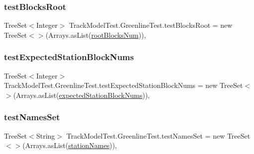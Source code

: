 \subsubsection{\texorpdfstring{test\+Blocks\+Root}{testBlocksRoot}}
{\footnotesize\ttfamily Tree\+Set$<$Integer$>$ Track\+Model\+Test.\+Greenline\+Test.\+test\+Blocks\+Root = new Tree\+Set$<$$>$(Arrays.\+as\+List(\hyperlink{classTrackModelTest_1_1GreenlineTest_a86d7af0d8ab2f0c855bdca4a06220e1d}{root\+Blocks\+Num}))\hspace{0.3cm}{\ttfamily [static]}, {\ttfamily [private]}}

\mbox{\label{classTrackModelTest_1_1GreenlineTest_a96de7e923c81cdf0dd85ece9d95104cc}} 
\subsubsection{\texorpdfstring{test\+Expected\+Station\+Block\+Nums}{testExpectedStationBlockNums}}
{\footnotesize\ttfamily Tree\+Set$<$Integer$>$ Track\+Model\+Test.\+Greenline\+Test.\+test\+Expected\+Station\+Block\+Nums = new Tree\+Set$<$$>$(Arrays.\+as\+List(\hyperlink{classTrackModelTest_1_1GreenlineTest_a70a5b1b7c0ad03d4ee8c021d32fc6585}{expected\+Station\+Block\+Nums}))\hspace{0.3cm}{\ttfamily [static]}, {\ttfamily [private]}}

\mbox{\label{classTrackModelTest_1_1GreenlineTest_a3507467040486c396edb29364f5a7bcd}} 
\subsubsection{\texorpdfstring{test\+Names\+Set}{testNamesSet}}
{\footnotesize\ttfamily Tree\+Set$<$String$>$ Track\+Model\+Test.\+Greenline\+Test.\+test\+Names\+Set = new Tree\+Set$<$$>$(Arrays.\+as\+List(\hyperlink{classTrackModelTest_1_1GreenlineTest_a47a3798d755d618e273ca1a11180db16}{station\+Names}))\hspace{0.3cm}{\ttfamily [static]}, {\ttfamily [private]}}

